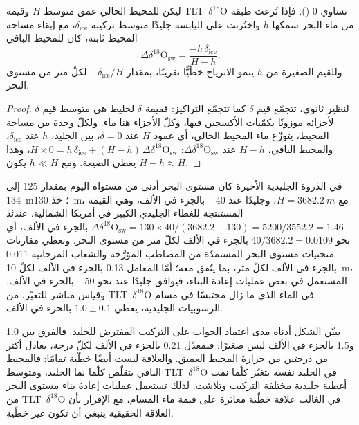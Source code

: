 \begin{proposition}\label{prop:b2:climate-proxies:mass-balance}
ليكن للمحيط الحالي عمق متوسط $H$ وقيمة \mbox{\textdir TLT $\delta^{18}$O} تساوي 0 (). فإذا نُزعت طبقة من ماء
البحر سمكها $h$ واختُزنت على اليابسة جليدًا متوسط تركيبه
$\delta_{\mathrm{ice}}$، مع إبقاء مساحة المحيط ثابتة، كان للمحيط الباقي
\[
  \Delta\delta^{18}\mathrm{O}_{\mathrm{sw}} = \frac{-h\,\delta_{\mathrm{ice}}}{H - h}.
\]
وللقيم الصغيرة من $h$ ينمو الانزياح خطّيًّا تقريبًا، بمقدار $-\delta_{\mathrm{ice}}/H$ لكلّ متر من مستوى البحر.
\end{proposition}

\begin{proof}
لنظير ثانوي، تتجمّع قيم $\delta$ كما تتجمّع التراكيز: فقيمة $\delta$ لخليط هي
متوسط قيم $\delta$ لأجزائه موزونًا بكمّيات الأكسجين فيها، وكلّ
الأجزاء هنا ماء. ولكلّ وحدة من مساحة المحيط، يتوزّع ماء المحيط الحالي، أي عمود $H$ عند
$\delta = 0$، بين الجليد، $h$ عند $\delta_{\mathrm{ice}}$، والمحيط الباقي،
$H - h$ عند $\Delta\delta^{18}\mathrm{O}_{\mathrm{sw}}$:
$H \times 0 = h\,\delta_{\mathrm{ice}} + (H - h)\,\Delta\delta^{18}\mathrm{O}_{\mathrm{sw}}$، وهذا
يعطي الصيغة. ومع $h \ll H$ يكون $H - h \approx H$.
\end{proof}

\begin{example}\label{ex:b2:climate-proxies:lgm}
في الذروة الجليدية الأخيرة كان مستوى البحر أدنى من مستواه اليوم بمقدار 125 إلى \qty{134}{m}؛ خذ \qty{130}{m}،
مع $H = \qty{3682.2}{m}$، وجليدًا عند $-40$ بالجزء في الألف، وهي القيمة المستنتجة للغطاء
الجليدي الكبير في أمريكا الشمالية. عندئذ
$\Delta\delta^{18}\mathrm{O}_{\mathrm{sw}} = 130 \times 40/(3682.2 - 130) = 5200/3552.2 = 1.46$
بالجزء في الألف، أي نحو $40/3682.2 = 0.0109$ بالجزء في الألف لكلّ متر من مستوى البحر. وتعطي مقارنات منحنيات مستوى البحر
المستمدّة من المصاطب المؤرَّخة والشعاب المرجانية \num{0.011} بالجزء في الألف لكلّ متر، بما يتّفق معه؛ أمّا المعامل
\num{0.13} بالجزء في الألف لكلّ \qty{10}{m}، المستعمل في بعض عمليات إعادة البناء، فيوافق جليدًا عند نحو
$-50$ بالجزء في الألف. وقياس مباشر للتغيّر، من \mbox{\textdir TLT $\delta^{18}$O} في الماء الذي ما زال محتبسًا
في مسام الرسوبيات الجليدية، يعطي $1.0 \pm 0.1$ بالجزء في الألف.
\end{example}

يبيّن الشكل أدناه مدى اعتماد الجواب على التركيب المفترض للجليد.
فالفرق بين \num{1.0} و\num{1.5} بالجزء في الألف ليس صغيرًا: فبمعدّل \num{0.21} بالجزء في الألف لكلّ درجة،
يعادل أكثر من درجتين من حرارة المحيط العميق. والعلاقة ليست أيضًا خطّية
تمامًا: فالمحيط الباقي يتقلّص كلّما نما الجليد، ومتوسط \mbox{\textdir TLT $\delta^{18}$O} في الجليد
نفسه يتغيّر كلّما نمت أغطية جليدية مختلفة التركيب وتلاشت. لذلك تستعمل عمليات إعادة بناء مستوى البحر
من \mbox{\textdir TLT $\delta^{18}$O} في الغالب علاقة خطّية معايَرة على قيمة ماء المسام، مع
الإقرار بأن العلاقة الحقيقية ينبغي أن تكون غير خطّية.

